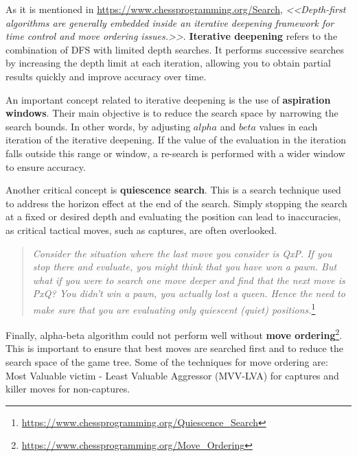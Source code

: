 \vspace{1em}

As it is mentioned in \url{https://www.chessprogramming.org/Search}, \textit{<<Depth-first algorithms are generally embedded inside an iterative deepening framework for time control and move ordering issues.>>}. \textbf{Iterative deepening} refers to the combination of DFS with limited depth searches. It performs successive searches by increasing the depth limit at each iteration, allowing you to obtain partial results quickly and improve accuracy over time.

\vspace{1em}

An important concept related to iterative deepening is the use of \textbf{aspiration windows}. Their main objective is to reduce the search space by narrowing the search bounds. In other words, by adjusting $alpha$ and $beta$ values in each iteration of the iterative deepening. If the value of the evaluation in the iteration falls outside this range or window, a re-search is performed with a wider window to ensure accuracy.

\vspace{1em}

Another critical concept is \textbf{quiescence search}. This is a search technique used to address the horizon effect at the end of the search. Simply stopping the search at a fixed or desired depth and evaluating the position can lead to inaccuracies, as critical tactical moves, such as captures, are often overlooked.

\begin{quotation}
    \textit{Consider the situation where the last move you consider is QxP. If you stop there and evaluate, you might think that you have won a pawn. But what if you were to search one move deeper and find that the next move is PxQ? You didn't win a pawn, you actually lost a queen. Hence the need to make sure that you are evaluating only quiescent (quiet) positions.}\footnote{\url{https://www.chessprogramming.org/Quiescence_Search}}
\end{quotation}

\vspace{1em}

Finally, alpha-beta algorithm could not perform well without \textbf{move ordering}\footnote{\url{https://www.chessprogramming.org/Move_Ordering}}. This is important to ensure that best moves are searched first and to reduce the search space of the game tree. Some of the techniques for move ordering are: Most Valuable victim - Least Valuable Aggressor (MVV-LVA) for captures and killer moves for non-captures. 

